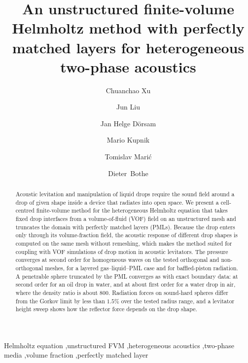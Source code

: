\documentclass[final,12pt,nopreprintline,longtitle]{elsarticle}
\begin{document}
\begin{frontmatter}

\title{An unstructured finite-volume Helmholtz method with perfectly matched layers for heterogeneous two-phase acoustics}

\author[mma]{Chuanchao Xu}
\author[mma]{Jun Liu}
\author[must]{Jan Helge Dörsam}
\author[must]{Mario Kupnik}
\author[mma]{Tomislav Mari\'{c}\texorpdfstring{}{}}
\author[mma]{Dieter~Bothe}


\begin{abstract}
\small
Acoustic levitation and manipulation of liquid drops require the sound field
around a drop of given shape inside a device that radiates into open space.
We present a cell-centred finite-volume method for the heterogeneous Helmholtz
equation that takes fixed drop interfaces from a volume-of-fluid (VOF) field
on an unstructured mesh and truncates the domain with perfectly matched layers
(PMLs).  Because the drop enters only through its volume-fraction field, the
acoustic response of different drop shapes is computed on the same mesh
without remeshing, which makes the method suited for coupling with VOF
simulations of drop motion in acoustic levitators.  The pressure converges at
second order for homogeneous waves on the tested orthogonal and
non-orthogonal meshes, for a layered gas--liquid--PML case and for
baffled-piston radiation.  A penetrable sphere truncated by the PML converges
as with exact boundary data: at second order for an oil drop in water, and at
about first order for a water drop in air, where the density ratio is about
800.  Radiation forces on sound-hard spheres differ from the Gorkov limit by
less than $1.5\%$ over the tested radius range, and a levitator height sweep
shows how the reflector force depends on the drop shape.
\end{abstract}

\begin{keyword}
Helmholtz equation \sep unstructured FVM \sep heterogeneous acoustics
\sep two-phase media \sep volume fraction \sep perfectly matched layer
\end{keyword}

\end{frontmatter}
\end{document}
